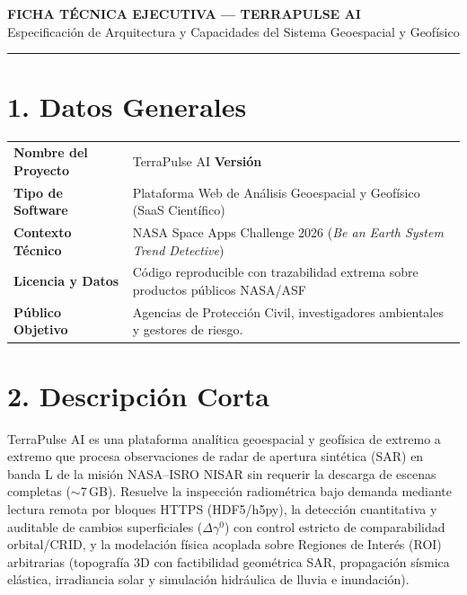 \documentclass[10pt,a4paper]{article}
\begin{document}
\begin{center}
{\Large\bfseries FICHA TÉCNICA EJECUTIVA — TERRAPULSE AI}\\[2pt]
{\small Especificación de Arquitectura y Capacidades del Sistema Geoespacial y Geofísico}
\end{center}
\hrule\medskip

\section*{1. Datos Generales}
\begin{tabularx}{\linewidth}{@{}lL@{}}
\toprule
\textbf{Nombre del Proyecto} & TerraPulse AI \hfill \textbf{Versión} \\
\textbf{Tipo de Software} & Plataforma Web de Análisis Geoespacial y Geofísico (SaaS Científico) \\
\textbf{Contexto Técnico} & NASA Space Apps Challenge 2026 (\emph{Be an Earth System Trend Detective}) \\
\textbf{Licencia y Datos} & Código reproducible con trazabilidad extrema sobre productos públicos NASA/ASF \\
\textbf{Público Objetivo} & Agencias de Protección Civil, investigadores ambientales y gestores de riesgo. \\
\bottomrule
\end{tabularx}

\section*{2. Descripción Corta}
TerraPulse AI es una plataforma analítica geoespacial y geofísica de extremo a extremo que procesa observaciones de radar de apertura sintética (SAR) en banda L de la misión NASA–ISRO NISAR sin requerir la descarga de escenas completas ($\sim$7\,GB). Resuelve la inspección radiométrica bajo demanda mediante lectura remota por bloques HTTPS (HDF5/h5py), la detección cuantitativa y auditable de cambios superficiales ($\Delta\gamma^0$) con control estricto de comparabilidad orbital/CRID, y la modelación física acoplada sobre Regiones de Interés (ROI) arbitrarias (topografía 3D con factibilidad geométrica SAR, propagación sísmica elástica, irradiancia solar y simulación hidráulica de lluvia e inundación).
\end{document}
